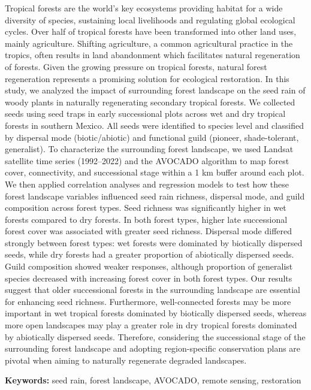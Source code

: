 

Tropical forests are the world's key ecosystems providing habitat for a wide diversity of species, sustaining local livelihoods and regulating global ecological cycles. Over half of tropical forests have been transformed into other land uses, mainly agriculture. Shifting agriculture, a common agricultural practice in the tropics, often results in land abandonment which facilitates natural regeneration of forests. Given the growing pressure on tropical forests, natural forest regeneration represents a promising solution for ecological restoration. In this study, we analyzed the impact of surrounding forest landscape on the seed rain of woody plants in naturally regenerating secondary tropical forests. We collected seeds using seed traps in early successional plots across wet and dry tropical forests in southern Mexico. All seeds were identified to species level and classified by dispersal mode (biotic/abiotic) and functional guild (pioneer, shade-tolerant, generalist). To characterize the surrounding forest landscape, we used Landsat satellite time series (1992–2022) and the AVOCADO algorithm to map forest cover, connectivity, and successional stage within a 1 km buffer around each plot. We then applied correlation analyses and regression models to test how these forest landscape variables influenced seed rain richness, dispersal mode, and guild composition across forest types. Seed richness was significantly higher in wet forests compared to dry forests. In both forest types, higher late successional forest cover was associated with greater seed richness. Dispersal mode differed strongly between forest types: wet forests were dominated by biotically dispersed seeds, while dry forests had a greater proportion of abiotically dispersed seeds. Guild composition showed weaker responses, although proportion of generalist species decreased with increasing forest cover in both forest types. Our results suggest that older successional forests in the surrounding landscape are essential for enhancing seed richness. Furthermore, well-connected forests may be more important in wet tropical forests dominated by biotically dispersed seeds, whereas more open landscapes may play a greater role in dry tropical forests dominated by abiotically dispersed seeds. Therefore, considering the successional stage of the surrounding forest landscape and adopting region-specific conservation plans are pivotal when aiming to naturally regenerate degraded landscapes.

\textbf{Keywords:} seed rain, forest landscape, AVOCADO, remote sensing, restoration